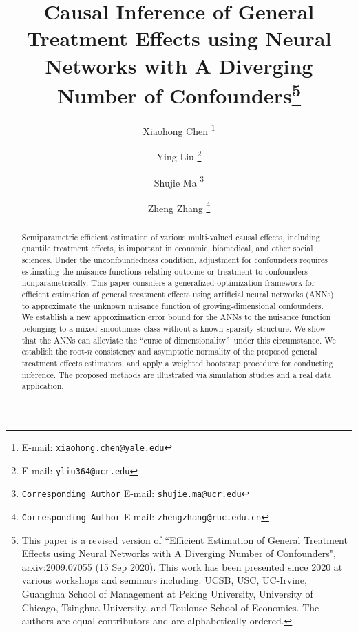 \documentclass[11pt]{article}
\date{}
\numberwithin{equation}{section}
\begin{document}
\title{{\Large Causal Inference of General Treatment Effects using Neural Networks with A Diverging Number of Confounders}\thanks{This paper is a revised version of ``Efficient Estimation of General
			Treatment Effects using Neural
			Networks with A Diverging Number of
			Confounders", arxiv:2009.07055 (15 Sep 2020). This work has been presented since 2020 at various workshops and seminars including: UCSB, USC, UC-Irvine,  Guanghua School of Management at Peking University, University of Chicago, Tsinghua University, and Toulouse School of Economics. The authors are equal contributors and are alphabetically ordered.}}
\author[$^\dagger$]{Xiaohong Chen \thanks{E-mail:
		\texttt{xiaohong.chen@yale.edu} }}
\author[$^\star$]{Ying Liu \thanks{E-mail:
		\texttt{yliu364@ucr.edu} }}
\author[$^\star$]{Shujie Ma \thanks{\texttt{Corresponding Author} E-mail:
\texttt{shujie.ma@ucr.edu}}}
\author[$\ddagger$] {Zheng Zhang \thanks{\texttt{Corresponding Author}
E-mail: \texttt{zhengzhang@ruc.edu.cn}}}



\maketitle

\begin{abstract}
Semiparametric efficient estimation of various multi-valued causal effects, including quantile treatment effects, is important in economic, biomedical, and other social sciences. Under the unconfoundedness condition, adjustment for confounders requires estimating the nuisance functions relating outcome or treatment to confounders nonparametrically. This paper considers a generalized optimization framework for efficient estimation of general treatment effects using artificial neural networks (ANNs) to approximate the unknown nuisance function of growing-dimensional confounders. We establish a new approximation error bound for the ANNs to the nuisance function belonging to a mixed smoothness class without a known sparsity structure. We show that the ANNs can alleviate the \textquotedblleft curse of dimensionality\textquotedblright\ under this circumstance. We establish
the root-$n$ consistency and asymptotic normality of the proposed general treatment effects estimators, and apply a weighted bootstrap procedure for conducting inference. The proposed
methods are illustrated via simulation studies and a real data application.
\end{abstract}
\end{document}
